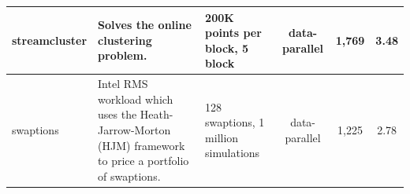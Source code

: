\begin{table}[!t]
\begin{tabular}{|p{1.6cm}|p{7.4cm}|p{3.8cm}|c|c|c|}
	streamcluster & Solves the online clustering problem. & 200K points per block, 5 block & 
data-parallel & 1,769 & 3.48 \\ \hline
	swaptions & Intel RMS workload which uses the Heath-Jarrow-Morton (HJM) framework to price a portfolio of swaptions. & 128 swaptions, 1 million  simulations & data-parallel & 1,225 & 2.78 \\ \hline
	\end{tabular}
	\label{tab:parsec}
	\vspace{-0.3cm}
\end{table}


% 



